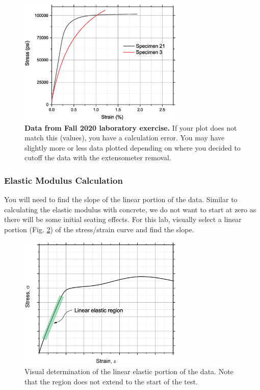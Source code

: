 \documentclass[12pt]{article}
\begin{document}
\begin{figure}
    \centering
    \includegraphics[width=0.7\textwidth]{real.eps}
    \caption{\textbf{Data from Fall 2020 laboratory exercise.} If your plot does not match this (values), you have a calculation error. You may have slightly more or less data plotted depending on where you decided to cutoff the data with the extensometer removal.}
    \label{fig:real}
\end{figure}

\subsubsection{Elastic Modulus Calculation}
You will need to find the slope of the linear portion of the data. Similar to calculating the elastic modulus with concrete, we do not want to start at zero as there will be some initial seating effects. For this lab, visually select a linear portion (Fig. \ref{fig:elastgraph}) of the stress/strain curve and find the slope.

\begin{figure}[h!]
    \centering
    \includegraphics[width=0.7\textwidth]{offset3.eps}
    \caption{Visual determination of the linear elastic portion of the data. Note that the region does not extend to the start of the test.}
    \label{fig:elastgraph}
\end{figure}
\end{document}
